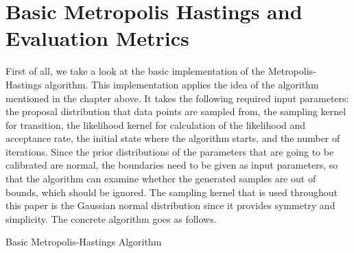 \section{Basic Metropolis Hastings and Evaluation Metrics}
First of all, we take a look at the basic implementation of the Metropolis-Hastings algorithm. This implementation applies the idea of the algorithm mentioned in the chapter above. It takes the following required input parameters: the proposal distribution that data points are sampled from, the sampling kernel for transition, the likelihood kernel for calculation of the likelihood and acceptance rate, the initial state where the algorithm starts, and the number of iterations. Since the prior distributions of the parameters that are going to be calibrated are normal, the boundaries need to be given as input parameters, so that the algorithm can examine whether the generated samples are out of bounds, which should be ignored. The sampling kernel that is used throughout this paper is the Gaussian normal distribution since it provides symmetry and simplicity.\cite{gaussian_distribution_property} The concrete algorithm goes as follows.
\begin{algorithm}[H]
\BlankLine


\caption{Basic Metropolis-Hastings Algorithm}
\end{algorithm}

